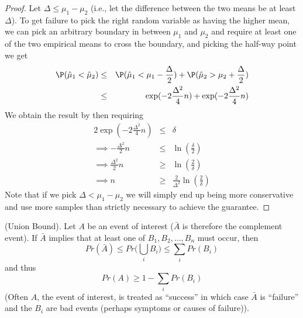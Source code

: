 \begin{proof}
Let $\Delta \leq \mu_1 - \mu_2$ (i.e., let the difference between the two means be at least $\Delta$). To get failure to pick the right random variable as having the higher mean, we can pick an arbitrary boundary in between $\mu_1$ and $\mu_2$ and require at least one of the two empirical means to cross the boundary, and picking the half-way point we get
\begin{eqnarray*}
\P(\hat{\mu}_1 < \hat{\mu}_2) & \leq & \P(\hat{\mu}_1 < \mu_1 - \frac{\Delta}{2}) + \P(\hat{\mu}_2 > \mu_2 + \frac{\Delta}{2}) \\
& \leq & \exp(-2 \frac{\Delta^2}{4} n) + \exp(-2 \frac{\Delta^2}{4} n)
\end{eqnarray*}
We obtain the result by then requiring
\begin{eqnarray*}
2\exp(-2 \frac{\Delta^2}{4} n) & \leq & \delta \\
\implies - \frac{\Delta^2}{2} n & \leq & \ln(\frac{\delta}{2}) \\
\implies \frac{\Delta^2}{2} n & \geq & \ln(\frac{2}{\delta}) \\
\implies n & \geq & \frac{2}{\Delta^2} \ln(\frac{2}{\delta})
\end{eqnarray*}
Note that if we pick $\Delta < \mu_1 - \mu_2$ we will simply end up being more conservative and use more samples than strictly necessary to achieve the guarantee.
\end{proof}



\begin{theorem} (Union Bound). Let $A$ be an event of interest ($\bar{A}$ is therefore the complement event). If $\bar{A}$ implies that at least one of $B_1, B_2, \ldots, B_n$ must occur, then
\[
Pr(\bar{A}) \leq Pr\Big(\bigcup_i B_i\Big) \leq \sum_i Pr(B_i)
\]
and thus
\[
Pr(A) \geq 1 - \sum_i Pr(B_i)
\]
(Often $A$, the event of interest, is treated as ``success'' in which case $\bar{A}$ is ``failure'' and the $B_i$ are bad events (perhaps symptoms or causes of failure)).
\end{theorem}


%
